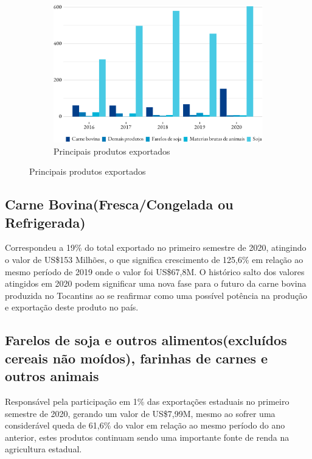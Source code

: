 \begin{figure}[!h]
	\begin{subfigure}{\linewidth}
		\caption{Principais produtos exportados}
		\includegraphics{fig/produtos_expo-1.pdf}
	\end{subfigure}
\end{figure}

\subsection{Carne Bovina(Fresca/Congelada ou Refrigerada)}
Correspondeu a 19\% do total exportado no primeiro semestre de 2020, atingindo o valor de US\$153 Milhões, o que significa crescimento de 125,6\% em relação ao mesmo período de 2019 onde o valor foi US\$67,8M. O histórico salto dos valores atingidos em 2020 podem significar uma nova fase para o futuro da carne bovina produzida no Tocantins ao se reafirmar como uma possível potência na produção e exportação deste produto no país.

\subsection {Farelos de soja e outros alimentos(excluídos cereais não moídos), farinhas de carnes e outros animais}
Responsável pela participação em 1\% das exportações estaduais no primeiro semestre de 2020, gerando um valor de US\$7,99M, mesmo ao sofrer uma considerável queda de 61,6\% do valor em relação ao mesmo período do ano anterior, estes produtos continuam sendo uma importante fonte de renda na agricultura estadual. 

